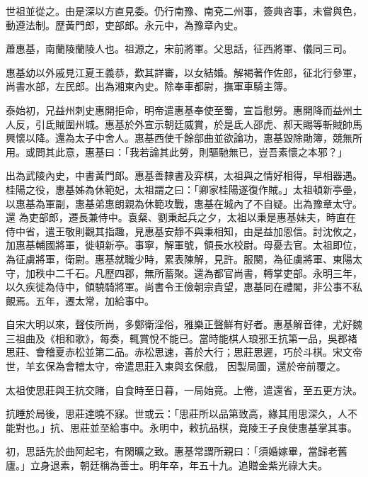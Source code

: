 \begin{pinyinscope}
 世祖並從之。由是深以方直見委。仍行南豫、南兗二州事，簽典咨事，未嘗與色，動遵法制。歷黃門郎，吏部郎。永元中，為豫章內史。



 蕭惠基，南蘭陵蘭陵人也。祖源之，宋前將軍。父思話，征西將軍、儀同三司。



 惠基幼以外戚見江夏王義恭，歎其詳審，以女結婚。解褐著作佐郎，征北行參軍，尚書水部，左民郎。出為湘東內史。除奉車都尉，撫軍車騎主簿。



 泰始初，兄益州刺史惠開拒命，明帝遣惠基奉使至蜀，宣旨慰勞。惠開降而益州土人反，引氐賊圍州城。惠基於外宣示朝廷威賞，於是氐人邵虎、郝天賜等斬賊帥馬興懷以降。還為太子中舍人。惠基西使千餘部曲並欲論功，惠基毀除勛簿，競無所用。或問其此意，惠基曰：「我若論其此勞，則驅馳無已，豈吾素懷之本邪？」



 出為武陵內史，中書黃門郎。惠基善隸書及弈棋，太祖與之情好相得，早相器遇。桂陽之役，惠基姊為休範妃，太祖謂之曰：「卿家桂陽遂復作賊。」太祖頓新亭壘，以惠基為軍副，惠基弟惠朗親為休範攻戰，惠基在城內了不自疑。出為豫章太守。還
 為吏部郎，遷長兼侍中。袁粲、劉秉起兵之夕，太祖以秉是惠基妹夫，時直在侍中省，遣王敬則觀其指趣，見惠基安靜不與秉相知，由是益加恩信。討沈攸之，加惠基輔國將軍，徙頓新亭。事寧，解軍號，領長水校尉。母憂去官。太祖即位，為征虜將軍，衛尉。惠基就職少時，累表陳解，見許。服闋，為征虜將軍、東陽太守，加秩中二千石。凡歷四郡，無所蓄聚。還為都官尚書，轉掌吏部。永明三年，以久疾徙為侍中，領驍騎將軍。尚書令王儉朝宗貴望，惠基同在禮閣，非公事不私覿焉。五年，遷太常，加給事中。



 自宋大明以來，聲伎所尚，多鄭衛淫俗，雅樂正聲鮮有好者。惠基解音律，尤好魏三祖曲及《相和歌》，每奏，輒賞悅不能已。當時能棋人琅邪王抗第一品，吳郡褚思莊、會稽夏赤松並第二品。赤松思速，善於大行；思莊思遲，巧於斗棋。宋文帝世，羊玄保為會稽太守，帝遣思莊入東與玄保戲，
 因製局圖，還於帝前覆之。



 太祖使思莊與王抗交賭，自食時至日暮，一局始竟。上倦，遣還省，至五更方決。



 抗睡於局後，思莊達曉不寐。世或云：「思莊所以品第致高，緣其用思深久，人不能對也。」抗、思莊並至給事中。永明中，敕抗品棋，竟陵王子良使惠基掌其事。



 初，思話先於曲阿起宅，有閑曠之致。惠基常謂所親曰：「須婚嫁畢，當歸老舊廬。」立身退素，朝廷稱為善士。明年卒，年五十九。追贈金紫光祿大夫。




\end{pinyinscope}
